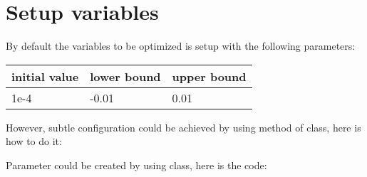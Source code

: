\documentclass[letterpaper,10pt,english]{sphinxmanual}
\begin{document}
\section{Setup variables}
\label{src/demos/demo3:setup-variables}\label{src/demos/demo3::doc}
By default the variables to be optimized is setup with the following
parameters:

\noindent\begin{tabulary}{\linewidth}{|L|L|L|}
\hline
\textsf{\relax 
initial value
\unskip}\relax &\textsf{\relax 
lower bound
\unskip}\relax &\textsf{\relax 
upper bound
\unskip}\relax \\
\hline
1e-4
&
-0.01
&
0.01
\\
\hline\end{tabulary}


However, subtle configuration could be achieved by using 
method of  class, here is how to do it:

Parameter could be created by using  class, here is the code:
\end{document}
